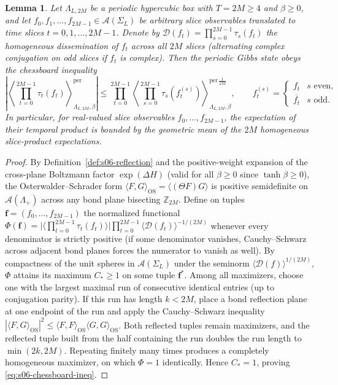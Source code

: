 \documentclass[11pt]{article}
\newtheorem{lemma}[theorem]{Lemma}
\theoremstyle{definition}
\begin{document}
\begin{lemma}
\label{lem:s06-chessboard}
Let $\Lambda_{L, 2M}$ be a periodic hypercubic box with $T = 2M \ge 4$ and $\beta
\ge 0$, and let $f_0, f_1, \dots, f_{2M-1} \in \mathcal{A}(\Sigma_L)$ be arbitrary
slice observables translated to time slices $t = 0, 1, \dots, 2M-1$. Denote by
$\mathcal{D}(f_t) = \prod_{s=0}^{2M-1} \tau_s(f_t)$ the homogeneous dissemination of
$f_t$ across all $2M$ slices (alternating complex conjugation on odd slices if $f_t$
is complex). Then the periodic Gibbs state obeys the \emph{chessboard inequality}
\begin{equation}
\label{eq:s06-chessboard-ineq}
  \left| \left\langle \prod_{t=0}^{2M-1} \tau_t(f_t) \right\rangle_{\Lambda_{L,2M},\beta}^{\mathrm{per}} \right| \le \prod_{t=0}^{2M-1} \left\langle \prod_{s=0}^{2M-1} \tau_s(f_t^{(s)}) \right\rangle_{\Lambda_{L,2M},\beta}^{\mathrm{per} \, \frac{1}{2M}}, \qquad f_t^{(s)} = \begin{cases} f_t & s \text{ even}, \\ \overline{f_t} & s \text{ odd}. \end{cases}
\end{equation}
In particular, for real-valued slice observables $f_0, \dots, f_{2M-1}$, the
expectation of their temporal product is bounded by the geometric mean of the $2M$
homogeneous slice-product expectations.
\end{lemma}
\begin{proof}
By Definition~\ref{def:s06-reflection} and the positive-weight expansion of the
cross-plane Boltzmann factor $\exp(\Delta H)$ (valid for all $\beta \ge 0$ since
$\tanh \beta \ge 0$), the Osterwalder--Schrader form $\langle F, G
\rangle_{\mathrm{OS}} = \langle (\Theta F) G \rangle$ is positive semidefinite on
$\mathcal{A}(\Lambda_+)$ across any bond plane bisecting $\mathbb{Z}_{2M}$. Define
on tuples $\mathbf{f} = (f_0, \dots, f_{2M-1})$ the normalized functional
$\Phi(\mathbf{f}) = \bigl|\langle \prod_{t=0}^{2M-1} \tau_t(f_t) \rangle\bigr|
\prod_{t=0}^{2M-1} \langle \mathcal{D}(f_t) \rangle^{-1/(2M)}$ whenever every
denominator is strictly positive (if some denominator vanishes, Cauchy--Schwarz
across adjacent bond planes forces the numerator to vanish as well). By compactness
of the unit spheres in $\mathcal{A}(\Sigma_L)$ under the seminorm $\langle
\mathcal{D}(f) \rangle^{1/(2M)}$, $\Phi$ attains its maximum $C_* \ge 1$ on some
tuple $\mathbf{f}^*$. Among all maximizers, choose one with the largest maximal run
of consecutive identical entries (up to conjugation parity). If this run has length
$k < 2M$, place a bond reflection plane at one endpoint of the run and apply the
Cauchy--Schwarz inequality $|\langle F, G \rangle_{\mathrm{OS}}|^2 \le \langle F, F
\rangle_{\mathrm{OS}} \langle G, G \rangle_{\mathrm{OS}}$. Both reflected tuples
remain maximizers, and the reflected tuple built from the half containing the run
doubles the run length to $\min(2k, 2M)$. Repeating finitely many times produces a
completely homogeneous maximizer, on which $\Phi = 1$ identically. Hence $C_* = 1$,
proving \eqref{eq:s06-chessboard-ineq}.
\end{proof}
\end{document}
